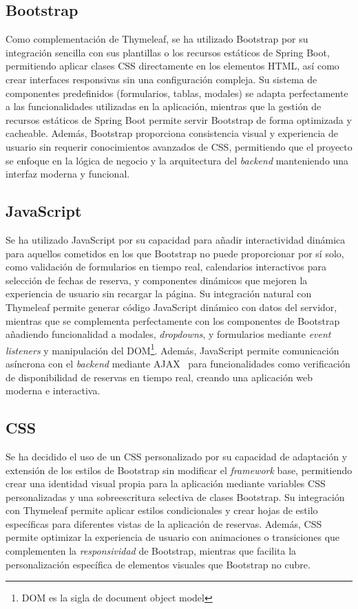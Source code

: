 \subsection{Bootstrap}\label{bootstrap}
Como complementación de Thymeleaf, se ha utilizado Bootstrap por su integración sencilla con sus plantillas o los recursos estáticos de Spring Boot, permitiendo aplicar clases CSS directamente en los elementos HTML, así como crear interfaces responsivas sin una configuración compleja. Su sistema de componentes predefinidos (formularios, tablas, modales) se adapta perfectamente a las funcionalidades utilizadas en la aplicación, mientras que la gestión de recursos estáticos de Spring Boot permite servir Bootstrap de forma optimizada y cacheable. Además, Bootstrap proporciona consistencia visual y experiencia de usuario sin requerir conocimientos avanzados de CSS, permitiendo que el proyecto se enfoque en la lógica de negocio y la arquitectura del \emph{backend} manteniendo una interfaz moderna y funcional.

\subsection{JavaScript}\label{javascript}
Se ha utilizado JavaScript por su capacidad para añadir interactividad dinámica para aquellos cometidos en los que Bootstrap no puede proporcionar por sí solo, como validación de formularios en tiempo real, calendarios interactivos para selección de fechas de reserva, y componentes dinámicos que mejoren la experiencia de usuario sin recargar la página. Su integración natural con Thymeleaf permite generar código JavaScript dinámico con datos del servidor, mientras que se complementa perfectamente con los componentes de Bootstrap añadiendo funcionalidad a modales, \emph{dropdowns}, y formularios mediante \emph{event listeners} y manipulación del DOM\footnote{DOM es la sigla de document object model}. Además, JavaScript permite comunicación asíncrona con el \emph{backend} mediante AJAX~\cite{ajax} para funcionalidades como verificación de disponibilidad de reservas en tiempo real, creando una aplicación web moderna e interactiva.

\subsection{CSS}\label{css}
Se ha decidido el uso de un CSS personalizado por su capacidad de adaptación y extensión de los estilos de Bootstrap sin modificar el \emph{framework} base, permitiendo crear una identidad visual propia para la aplicación mediante variables CSS personalizadas y una sobreescritura selectiva de clases Bootstrap. Su integración con Thymeleaf permite aplicar estilos condicionales y crear hojas de estilo específicas para diferentes vistas de la aplicación de reservas. Además, CSS permite optimizar la experiencia de usuario con animaciones o transiciones que complementen la \emph{responsividad} de Bootstrap, mientras que facilita la personalización específica de elementos visuales que Bootstrap no cubre.

